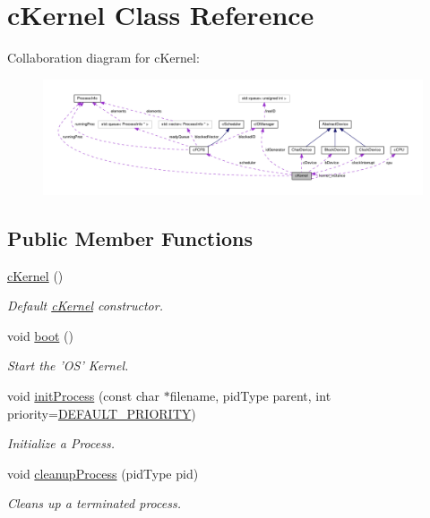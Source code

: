 \hypertarget{classcKernel}{\section{c\-Kernel \-Class \-Reference}
\label{db/da5/classcKernel}
}


\-Collaboration diagram for c\-Kernel\-:\nopagebreak
\begin{figure}[H]
\begin{center}
\leavevmode
\includegraphics[width=350pt]{d4/d6f/classcKernel__coll__graph}
\end{center}
\end{figure}
\subsection*{\-Public \-Member \-Functions}
\begin{DoxyCompactItemize}
\item 
\hyperlink{classcKernel_a64d105a595a4d14a47bb65426b331159}{c\-Kernel} ()
\begin{DoxyCompactList}\small\item\em \-Default \hyperlink{classcKernel}{c\-Kernel} constructor. \end{DoxyCompactList}\item 
void \hyperlink{classcKernel_a0ce9a2721bb1ea4d7f999198634f702d}{boot} ()
\begin{DoxyCompactList}\small\item\em \-Start the '\-O\-S' \-Kernel. \end{DoxyCompactList}\item 
void \hyperlink{classcKernel_a5440eace2647ffd5279de55600947b84}{init\-Process} (const char $\ast$filename, pid\-Type parent, int priority=\hyperlink{kernel_8h_a0756f011ef667460d583017366823244}{\-D\-E\-F\-A\-U\-L\-T\-\_\-\-P\-R\-I\-O\-R\-I\-T\-Y})
\begin{DoxyCompactList}\small\item\em \-Initialize a \-Process. \end{DoxyCompactList}\item 
void \hyperlink{classcKernel_a1e7cb5c6d9e6140e197f9b18dc8bd1b1}{cleanup\-Process} (pid\-Type pid)
\begin{DoxyCompactList}\small\item\em \-Cleans up a terminated process. \end{DoxyCompactList}\end{DoxyCompactItemize}
